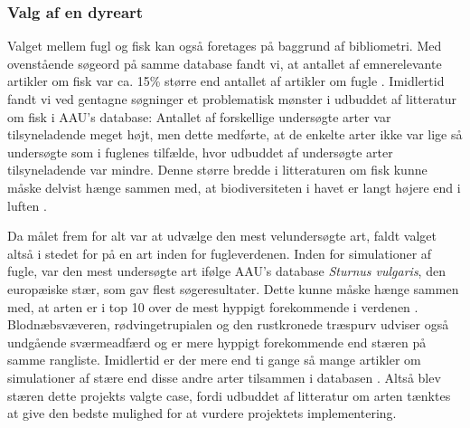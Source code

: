 \subsubsection{Valg af en dyreart}
Valget mellem fugl og fisk kan også foretages på baggrund af bibliometri. Med ovenstående søgeord på samme database fandt vi, at antallet af emnerelevante artikler om fisk var ca. 15\% større end antallet af artikler om fugle \cite{AUB}. Imidlertid fandt vi ved gentagne søgninger et problematisk mønster i udbuddet af litteratur om fisk i AAU's database: Antallet af forskellige undersøgte arter var tilsyneladende meget højt, men dette medførte, at de enkelte arter ikke var lige så undersøgte som i fuglenes tilfælde, hvor udbuddet af undersøgte arter tilsyneladende var mindre. Denne større bredde i litteraturen om fisk kunne måske delvist hænge sammen med, at biodiversiteten i havet er langt højere end i luften \cite{jakhsha2010}.
\par
Da målet frem for alt var at udvælge den mest velundersøgte art, faldt valget altså i stedet for på en art inden for fugleverdenen. Inden for simulationer af fugle, var den mest undersøgte art ifølge AAU's database \textit{Sturnus vulgaris}, den europæiske stær, som gav flest søgeresultater. Dette kunne måske hænge sammen med, at arten er i top 10 over de mest hyppigt forekommende i verdenen \cite{birdtop10}. Blodnæbsvæveren, rødvingetrupialen og den rustkronede træspurv udviser også undgående sværmeadfærd og er mere hyppigt forekommende end stæren på samme rangliste. Imidlertid er der mere end ti gange så mange artikler om simulationer af stære end disse andre arter tilsammen i databasen \cite{AUB}. Altså blev stæren dette projekts valgte case, fordi udbuddet af litteratur om arten tænktes at give den bedste mulighed for at vurdere projektets implementering. 



\todo[inline]{}